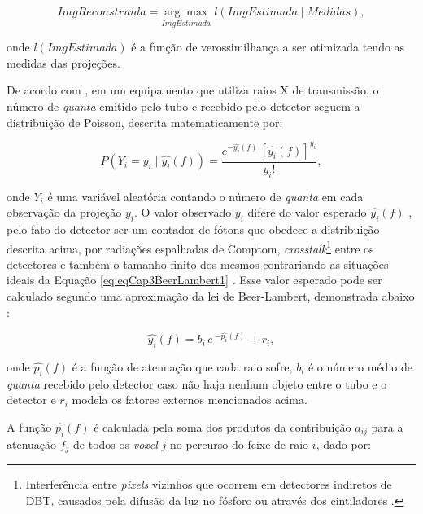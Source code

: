 {{\begin{equation}
ImgReconstruida = \underset{ImgEstimada}{\arg\max} \; l(ImgEstimada \mid Medidas),
\label{eq:eqCap3ModeloVerossimilhança}
\end{equation} 

\noindent onde $l(ImgEstimada)$ é a função de verossimilhança a ser otimizada tendo as medidas das projeções.


De acordo com , em um equipamento que utiliza raios X de transmissão, o número de \textit{quanta} emitido pelo tubo e recebido pelo detector seguem a distribuição de Poisson, descrita matematicamente por:

\begin{equation}
P(Y_{i} = y_{i} \mid \hat{y_{i}}(f) ) = \dfrac{e^{-\hat{y_{i}}(f) } \, [\hat{y_{i}}(f)] ^{y_{i}}}  {y_{i}!},
\label{eq:eqCap3DistribuicaoPoisson}
\end{equation}

\noindent onde $Y_{i}$ é uma variável aleatória contando o número de \textit{quanta} em cada observação da projeção $y_{i}$. O valor observado $y_{i}$ difere do valor esperado $\hat{y_{i}}(f)$ , pelo fato do detector ser um contador de fótons que obedece a distribuição descrita acima, por radiações espalhadas de Comptom, \textit{crosstalk}\footnote{Interferência entre \textit{pixels} vizinhos que ocorrem em detectores indiretos de \acs{DBT}, causados pela difusão da luz no fósforo ou através dos cintiladores \cite{zheng2018detector}.} entre os detectores e também o tamanho finito dos mesmos contrariando as situações ideais da Equação \ref{eq:eqCap3BeerLambert1} \cite[p. 6]{Fessler2000handbook}. Esse valor esperado pode ser calculado segundo uma aproximação da lei de Beer-Lambert, demonstrada abaixo \cite[p. 9]{Fessler2000handbook}:

\begin{equation}
\hat{y_{i}}(f) = b_{i} \, e \, ^{-\hat{p_{i}}(f)} \, + r_{i},
\label{eq:eqCap3BeerLambertDiscreto2}
\end{equation}

\noindent onde $\hat{p_{i}}(f)$ é a função de atenuação que cada raio sofre, $b_{i}$ é o número médio de \textit{quanta} recebido pelo detector caso não haja nenhum objeto entre o tubo e o detector e $r_{i}$ modela os fatores externos mencionados acima. 

A função $\hat{p_{i}}(f)$ é calculada pela soma dos produtos da contribuição $a_{ij}$ para a atenuação $f_{j}$ de todos os \textit{voxel} $j$ no percurso do feixe de raio $i$, dado por: 


}}
